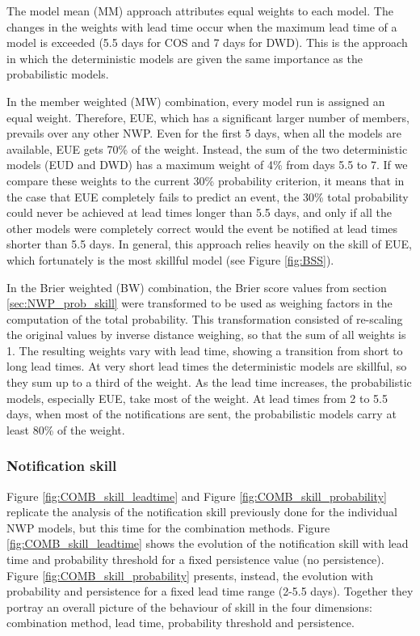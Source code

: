 \documentclass[preprint,12pt]{elsarticle}
\begin{document}
The model mean (MM) approach attributes equal weights to each model. The changes in the weights with lead time occur when the maximum lead time of a model is exceeded (5.5 days for COS and 7 days for DWD). This is the approach in which the deterministic models are given the same importance as the probabilistic models.

In the member weighted (MW) combination, every model run is assigned an equal weight. Therefore, EUE, which has a significant larger number of members, prevails over any other NWP. Even for the first 5 days, when all the models are available, EUE gets 70\% of the weight. Instead, the sum of the two deterministic models (EUD and DWD) has a maximum weight of 4\% from days 5.5 to 7. If we compare these weights to the current 30\% probability criterion, it means that in the case that EUE completely fails to predict an event, the 30\% total probability could never be achieved at lead times longer than 5.5 days, and only if all the other models were completely correct would the event be notified at lead times shorter than 5.5 days. In general, this approach relies heavily on the skill of EUE, which fortunately is the most skillful model (see Figure \ref{fig:BSS}).

In the Brier weighted (BW) combination, the Brier score values from section \ref{sec:NWP_prob_skill} were transformed to be used as weighing factors in the computation of the total probability. This transformation consisted of re-scaling the original values by inverse distance weighing, so that the sum of all weights is 1. The resulting weights vary with lead time, showing a transition from short to long lead times. At very short lead times the deterministic models are skillful, so they sum up to a third of the weight. As the lead time increases, the probabilistic models, especially EUE, take most of the weight. At lead times from 2 to 5.5 days, when most of the notifications are sent, the probabilistic models carry at least 80\% of the weight.

\subsubsection{Notification skill}
\label{sec:COMB_skill}

Figure \ref{fig:COMB_skill_leadtime} and Figure \ref{fig:COMB_skill_probability} replicate the analysis of the notification skill previously done for the individual NWP models, but this time for the combination methods. Figure \ref{fig:COMB_skill_leadtime} shows the evolution of the notification skill with lead time and probability threshold for a fixed persistence value (no persistence). Figure \ref{fig:COMB_skill_probability} presents, instead, the evolution with probability and persistence for a fixed lead time range (2-5.5 days). Together they portray an overall picture of the behaviour of skill in the four dimensions: combination method, lead time, probability threshold and persistence.
\end{document}
